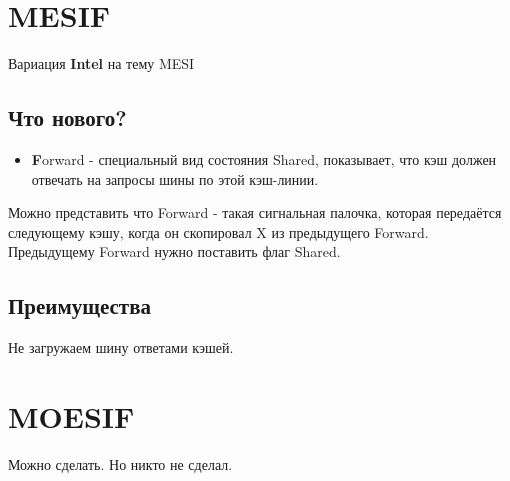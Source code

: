 \documentclass[12pt, a4paper]{article}
\begin{document}
\section{MESIF}
Вариация \textbf{Intel} на тему MESI
\subsection{Что нового?}
\begin{itemize}
    \item \textbf{F}orward - специальный вид состояния Shared, показывает, что кэш должен отвечать на запросы шины по этой кэш-линии.
\end{itemize}
Можно представить что Forward - такая сигнальная палочка, которая передаётся следующему кэшу, когда он скопировал X из предыдущего Forward. Предыдущему Forward нужно поставить флаг Shared.
\subsection{Преимущества}
Не загружаем шину ответами кэшей.
\section{MOESIF}
Можно сделать. Но никто не сделал.
\end{document}
